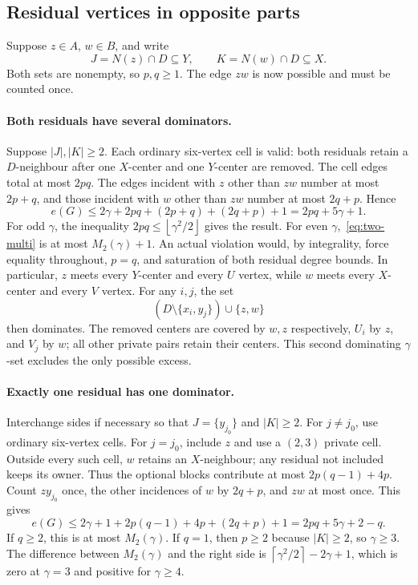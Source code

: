 \documentclass[11pt]{article}
\theoremstyle{definition}
\theoremstyle{remark}
\newcommand{\e}{e}
\newcommand{\ceil}[1]{\left\lceil#1\right\rceil}
\newcommand{\floor}[1]{\left\lfloor#1\right\rfloor}
\begin{document}
\subsection{Residual vertices in opposite parts}

Suppose $z\in A$, $w\in B$, and write
\[
 J=N(z)\cap D\subseteq Y,\qquad K=N(w)\cap D\subseteq X.
\]
Both sets are nonempty, so $p,q\ge1$. The edge $zw$ is now possible and
must be counted once.

\paragraph{Both residuals have several dominators.}
Suppose $|J|,|K|\ge2$. Each ordinary six-vertex cell is valid: both
residuals retain a $D$-neighbour after one $X$-center and one $Y$-center
are removed. The cell edges total at most $2pq$. The edges incident with
$z$ other than $zw$ number at most $2p+q$, and those incident with $w$
other than $zw$ number at most $2q+p$. Hence
\begin{equation}\label{eq:two-multi}
 \e(G)\le2\gamma+2pq+(2p+q)+(2q+p)+1=2pq+5\gamma+1.
\end{equation}
For odd $\gamma$, the inequality $2pq\le\floor{\gamma^2/2}$ gives the result.
For even $\gamma$,~\eqref{eq:two-multi} is at most $M_2(\gamma)+1$.
An actual violation would, by integrality, force equality throughout,
$p=q$, and saturation of both residual degree bounds. In particular,
$z$ meets every $Y$-center and every $U$ vertex, while $w$ meets every
$X$-center and every $V$ vertex. For any $i,j$, the set
\[
 (D\setminus\{x_i,y_j\})\cup\{z,w\}
\]
then dominates. The removed centers are covered by $w,z$ respectively,
$U_i$ by $z$, and $V_j$ by $w$; all other private pairs retain their centers.
This second dominating $\gamma$-set excludes the only possible excess.

\paragraph{Exactly one residual has one dominator.}
Interchange sides if necessary so that $J=\{y_{j_0}\}$ and $|K|\ge2$.
For $j\ne j_0$, use ordinary six-vertex cells. For $j=j_0$, include $z$
and use a $(2,3)$ private cell. Outside every such cell, $w$ retains an
$X$-neighbour; any residual not included keeps its owner. Thus the optional
blocks contribute at most $2p(q-1)+4p$. Count $zy_{j_0}$ once, the other
incidences of $w$ by $2q+p$, and $zw$ at most once. This gives
\begin{equation}\label{eq:two-mixed}
 \e(G)\le2\gamma+1+2p(q-1)+4p+(2q+p)+1
       =2pq+5\gamma+2-q.
\end{equation}
If $q\ge2$, this is at most $M_2(\gamma)$. If $q=1$, then $p\ge2$ because
$|K|\ge2$, so $\gamma\ge3$. The difference between $M_2(\gamma)$ and the
right side is $\ceil{\gamma^2/2}-2\gamma+1$, which is zero at $\gamma=3$
and positive for $\gamma\ge4$.
\end{document}
